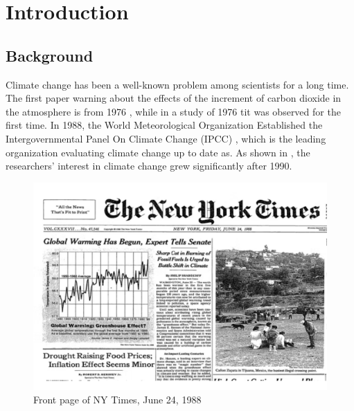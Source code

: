 
\chapter{Introduction}  %
\label{Introduction}

\ifpdf
    \graphicspath{{Chapter1/Figs/Raster/}{Chapter1/Figs/PDF/}{Chapter1/Figs/}}
\else
    \graphicspath{{Chapter1/Figs/Vector/}{Chapter1/Figs/}}
\fi
\section{Background}
Climate change has been a well-known problem among scientists for a long time. The first paper warning about the effects of the increment of carbon dioxide in the atmosphere is from 1976 \cite{manabe_thermal_1967}, while in a study of 1976 \cite{keeling_atmospheric_1976} tit was observed for the first time. In 1988, the World Meteorological Organization Established the Intergovernmental Panel On Climate Change (IPCC) \cite{baker_1989}, which is the leading organization evaluating climate change up to date as. As shown in \cite{santos_climate_2021}, the researchers' interest in climate change grew significantly after 1990. 

\begin{figure}[H]
    \centering
    \includegraphics[width=0.75\linewidth]{Chapter1/figures/global_warming copy.pdf}
    \caption{Front page of NY Times, June 24, 1988 }
    \label{fig:enter-label}
\end{figure}

